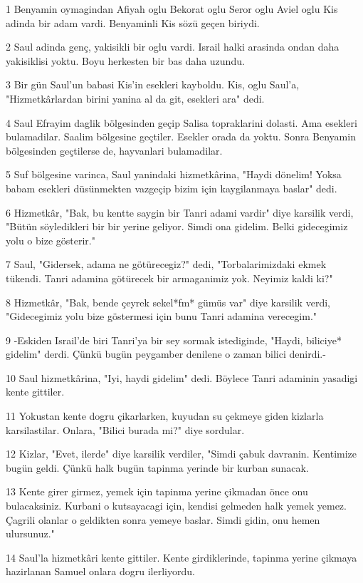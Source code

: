 \par 1 Benyamin oymagindan Afiyah oglu Bekorat oglu Seror oglu Aviel oglu Kis adinda bir adam vardi. Benyaminli Kis sözü geçen biriydi.
\par 2 Saul adinda genç, yakisikli bir oglu vardi. Israil halki arasinda ondan daha yakisiklisi yoktu. Boyu herkesten bir bas daha uzundu.
\par 3 Bir gün Saul'un babasi Kis'in esekleri kayboldu. Kis, oglu Saul'a, "Hizmetkârlardan birini yanina al da git, esekleri ara" dedi.
\par 4 Saul Efrayim daglik bölgesinden geçip Salisa topraklarini dolasti. Ama esekleri bulamadilar. Saalim bölgesine geçtiler. Esekler orada da yoktu. Sonra Benyamin bölgesinden geçtilerse de, hayvanlari bulamadilar.
\par 5 Suf bölgesine varinca, Saul yanindaki hizmetkârina, "Haydi dönelim! Yoksa babam esekleri düsünmekten vazgeçip bizim için kaygilanmaya baslar" dedi.
\par 6 Hizmetkâr, "Bak, bu kentte saygin bir Tanri adami vardir" diye karsilik verdi, "Bütün söyledikleri bir bir yerine geliyor. Simdi ona gidelim. Belki gidecegimiz yolu o bize gösterir."
\par 7 Saul, "Gidersek, adama ne götürecegiz?" dedi, "Torbalarimizdaki ekmek tükendi. Tanri adamina götürecek bir armaganimiz yok. Neyimiz kaldi ki?"
\par 8 Hizmetkâr, "Bak, bende çeyrek sekel*fm* gümüs var" diye karsilik verdi, "Gidecegimiz yolu bize göstermesi için bunu Tanri adamina verecegim."
\par 9 -Eskiden Israil'de biri Tanri'ya bir sey sormak istediginde, "Haydi, biliciye* gidelim" derdi. Çünkü bugün peygamber denilene o zaman bilici denirdi.-
\par 10 Saul hizmetkârina, "Iyi, haydi gidelim" dedi. Böylece Tanri adaminin yasadigi kente gittiler.
\par 11 Yokustan kente dogru çikarlarken, kuyudan su çekmeye giden kizlarla karsilastilar. Onlara, "Bilici burada mi?" diye sordular.
\par 12 Kizlar, "Evet, ilerde" diye karsilik verdiler, "Simdi çabuk davranin. Kentimize bugün geldi. Çünkü halk bugün tapinma yerinde bir kurban sunacak.
\par 13 Kente girer girmez, yemek için tapinma yerine çikmadan önce onu bulacaksiniz. Kurbani o kutsayacagi için, kendisi gelmeden halk yemek yemez. Çagrili olanlar o geldikten sonra yemeye baslar. Simdi gidin, onu hemen ulursunuz."
\par 14 Saul'la hizmetkâri kente gittiler. Kente girdiklerinde, tapinma yerine çikmaya hazirlanan Samuel onlara dogru ilerliyordu.

